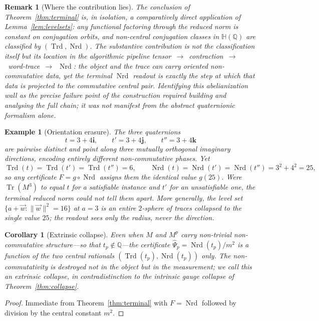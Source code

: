 \documentclass[pdflatex,sn-mathphys-num]{sn-jnl}
\theoremstyle{thmstyleone}%
\newtheorem{corollary}[theorem]{Corollary}%
\theoremstyle{thmstyletwo}%
\newtheorem{example}{Example}%
\newtheorem{remark}{Remark}%
\theoremstyle{thmstylethree}%
\newcommand{\HH}{\mathbb{H}}
\newcommand{\QQ}{\mathbb{Q}}
\newcommand{\Nrd}{\operatorname{Nrd}}
\newcommand{\Trd}{\operatorname{Trd}}
\newcommand{\Tr}{\operatorname{Tr}}
\newcommand{\bi}{\mathbf{i}}
\newcommand{\bj}{\mathbf{j}}
\newcommand{\bk}{\mathbf{k}}
\begin{document}
\begin{remark}[Where the contribution lies]\label{rem:terminal}
The conclusion of Theorem~\ref{thm:terminal} is, in isolation, a
comparatively direct application of Lemma~\ref{lem:levelsets}: any
functional factoring through the reduced norm is constant on conjugation
orbits, and non-central conjugation classes in $\HH(\QQ)$ are classified by
$(\Trd,\Nrd)$. The substantive contribution is not the classification
itself but its \emph{location} in the algorithmic pipeline
tensor~$\to$~contraction~$\to$~word-trace~$\to$~$\Nrd$: the object and
the trace can carry oriented non-commutative data, yet the terminal
$\Nrd$ readout is exactly the step at which that data is projected to the
commutative central pair. Identifying this abelianization wall as the
precise failure point of the construction required building and analysing
the full chain; it was not manifest from the abstract quaternionic
formalism alone.
\end{remark}

\begin{example}[Orientation erasure]\label{ex:erase}
The three quaternions
\[
  t=3+4\bi,\qquad t'=3+4\bj,\qquad t''=3+4\bk
\]
are pairwise distinct and point along three mutually orthogonal imaginary
directions, encoding entirely different non-commutative phases. Yet
\[
  \Trd(t)=\Trd(t')=\Trd(t'')=6,\qquad
  \Nrd(t)=\Nrd(t')=\Nrd(t'')=3^2+4^2=25,
\]
so any certificate $F=g\circ\Nrd$ assigns them the identical value
$g(25)$. Were $\Tr(M^3)$ to equal $t$ for a satisfiable instance and $t'$
for an unsatisfiable one, the terminal reduced norm could not tell them
apart. More generally, the level set $\{a+\vec w:\lVert\vec
w\rVert^2=16\}$ at $a=3$ is an entire $2$-sphere of traces collapsed to the
single value $25$; the readout sees only the radius, never the direction.
\end{example}

\begin{corollary}[Extrinsic collapse]\label{cor:extrinsic}
Even when $M$ and $M^p$ carry non-trivial non-commutative structure---so
that $t_p\notin\QQ$---the certificate $\widehat\Psi_p=\Nrd(t_p)/m^2$ is a
function of the two central rationals $(\Trd(t_p),\Nrd(t_p))$ only. The
non-commutativity is destroyed not in the object but in the measurement;
we call this an \emph{extrinsic} collapse, in contradistinction to the
intrinsic gauge collapse of Theorem~\ref{thm:collapse}.
\end{corollary}

\begin{proof}
Immediate from Theorem~\ref{thm:terminal} with $F=\Nrd$ followed by division
by the central constant $m^2$.
\end{proof}
\end{document}
